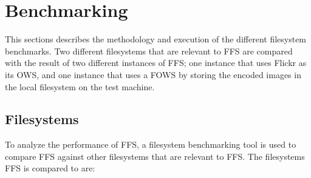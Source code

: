 \section{Benchmarking}
This sections describes the methodology and execution of the different filesystem benchmarks. Two different filesystems that are relevant to FFS are compared with the result of two different instances of FFS; one instance that uses Flickr as its OWS, and one instance that uses a FOWS by storing the encoded images in the local filesystem on the test machine.

\subsection{Filesystems}
To analyze the performance of FFS, a filesystem benchmarking tool is used to compare FFS against other filesystems that are relevant to FFS. The filesystems FFS is compared to are:
